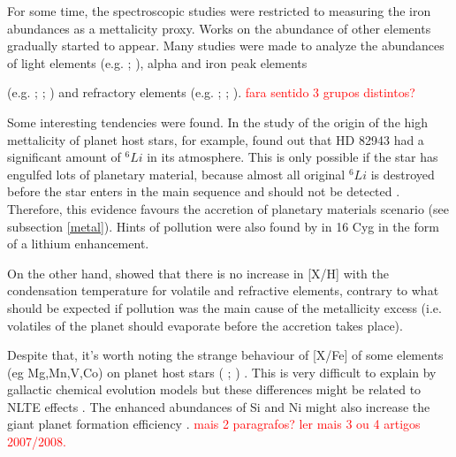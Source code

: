 \documentclass[dvips,12pt,a4paper]{report}
\begin{document}
For some time, the spectroscopic studies were restricted to measuring the iron abundances as a mettalicity proxy. Works on the abundance of other elements gradually started to appear.
Many studies were made to analyze the abundances of light elements (e.g. \citeauthor{Sandquist-2002} \citeyear{Sandquist-2002}; \citeauthor{Israelian-2003} \citeyear{Israelian-2003}), alpha and iron peak elements {(e.g.  \citeauthor{Gonzalez-2001} \citeyear{Gonzalez-2001}; \citeauthor{Takeda-2001} \citeauthor{Takeda-2001} \citeyear{Takeda-2001}; \citeauthor{Ecuvillon-2004b} \citeyear{Ecuvillon-2004b} \citeauthor{Fischer-2005} \citeyear{Fischer-2005}) and refractory elements (e.g. \citeauthor{Bodaghee-2003} \citeyear{Bodaghee-2003}; \citeauthor{Gilli-2006} \citeyear{Gilli-2006}; \citeauthor{Beirao-2005} \citeyear{Beirao-2005}). \textcolor{red}{fara sentido 3 grupos distintos?}

Some interesting tendencies were found. In the study of the origin of the high mettalicity of planet host stars, for example, \citet{Israelian-2003} found out that HD 82943 had a significant amount of $^6Li$ in its atmosphere. This is only possible if the star has engulfed lots of planetary material, because almost all original $^6Li$ is destroyed before the star enters in the main sequence and should not be detected \citep{Sandquist-2002}. Therefore, this evidence favours the accretion of planetary materials scenario (see subsection \ref{metal}). Hints of pollution were also found by \citet{Laws-2001} in 16 Cyg  in the form of a lithium enhancement.

On the other hand, \citet{Ecuvillon-2006b} showed that there is no increase in [X/H] with the condensation temperature for volatile and refractive elements, contrary to what should be expected if pollution was the main cause of the metallicity excess (i.e. volatiles of the planet should evaporate before the accretion takes place). 

Despite that, it's worth noting the strange behaviour of [X/Fe] of some elements (eg Mg,Mn,V,Co) on planet host stars (\citeauthor{Bodaghee-2003} \citeyear{Bodaghee-2003}; \citeauthor{Gilli-2006} \citeyear{Gilli-2006}) . This is very difficult to explain by gallactic chemical evolution models but these differences might be related to NLTE effects \citep{Bodaghee-2003}. The enhanced abundances of Si and Ni might also increase the giant planet formation efficiency \citep{Robinson-2006}.
\textcolor{red}{mais 2 paragrafos? ler mais 3 ou 4 artigos 2007/2008.}

}
\end{document}
